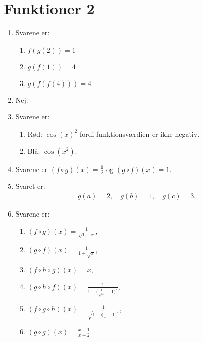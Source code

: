 \newpage
\section{Funktioner 2}

\begin{enumerate}
	
	\item Svarene er:
	\begin{enumerate}
		\item $f(g(2))=1$
		\item $g(f(1))=4$
		\item $g(f(f(4)))=4$
	\end{enumerate}
	
	\item Nej.
	
	\item Svarene er:
	\begin{enumerate}
		\item Rød: $\cos(x)^2$ fordi funktionsværdien er ikke-negativ.
		\item Blå: $\cos(x^2)$.
	\end{enumerate}
	
	
	\item Svarene er $ (f\circ g)(x)= \frac{1}{2}$ og $ (g\circ f)(x)=1 $.
	
	\item Svaret er:
	\begin{align*}
	g(a)=2,\quad g(b)=1,\quad g(c)=3.
	\end{align*}
	
	\item Svarene er:
	\begin{enumerate}
		\item $(f\circ g)(x)=\frac{1}{\sqrt{1+x}}$,
		\item $(g\circ f)(x)=\frac{1}{1+\sqrt{x}}$,
		\item $(f\circ h\circ g)(x)=x$,
		\item $(g\circ h \circ f)(x)=\frac{1}{1+\Big(\frac{1}{\sqrt{x}}-1 \Big)^{2}}$,
		\item $ (f\circ g \circ h )(x)=\frac{1}{\sqrt{1+\Big(\frac{1}{x}-1 \Big)^{2}}}$,
		\item $(g\circ g)(x)=\frac{x+1}{x+2}$.
	\end{enumerate}
	

\end{enumerate}
